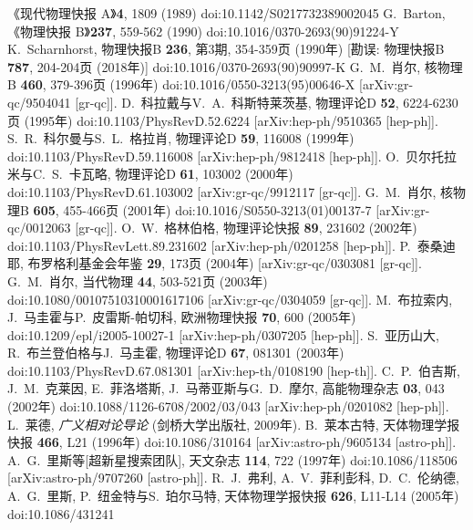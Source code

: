 \documentclass[jkps,preprint,fleqn]{revtex4}
\begin{document}
\begin{CJK*}{UTF8}{gbsn}
\begin{thebibliography}{999}
《现代物理快报 A》\textbf{4}, 1809 (1989)
doi:10.1142/S0217732389002045
G.~Barton,
《物理快报 B》\textbf{237}, 559-562 (1990)
doi:10.1016/0370-2693(90)91224-Y
K.~Scharnhorst,
物理快报B \textbf{236}, 第3期, 354-359页 (1990年)
[勘误: 物理快报B \textbf{787}, 204-204页 (2018年)]
doi:10.1016/0370-2693(90)90997-K
G.~M.~肖尔,
核物理B \textbf{460}, 379-396页 (1996年)
doi:10.1016/0550-3213(95)00646-X
[arXiv:gr-qc/9504041 [gr-qc]].
D.~科拉戴与V.~A.~科斯特莱茨基,
物理评论D \textbf{52}, 6224-6230页 (1995年)
doi:10.1103/PhysRevD.52.6224
[arXiv:hep-ph/9510365 [hep-ph]].
S.~R.~科尔曼与S.~L.~格拉肖,
物理评论D \textbf{59}, 116008 (1999年)
doi:10.1103/PhysRevD.59.116008
[arXiv:hep-ph/9812418 [hep-ph]].
O.~贝尔托拉米与C.~S.~卡瓦略,
物理评论D \textbf{61}, 103002 (2000年)
doi:10.1103/PhysRevD.61.103002
[arXiv:gr-qc/9912117 [gr-qc]].
G.~M.~肖尔,
核物理B \textbf{605}, 455-466页 (2001年)
doi:10.1016/S0550-3213(01)00137-7
[arXiv:gr-qc/0012063 [gr-qc]].
O.~W.~格林伯格,
物理评论快报 \textbf{89}, 231602 (2002年)
doi:10.1103/PhysRevLett.89.231602
[arXiv:hep-ph/0201258 [hep-ph]].
P.~泰桑迪耶,
布罗格利基金会年鉴 \textbf{29}, 173页 (2004年)
[arXiv:gr-qc/0303081 [gr-qc]].
G.~M.~肖尔,
当代物理 \textbf{44}, 503-521页 (2003年)
doi:10.1080/00107510310001617106
[arXiv:gr-qc/0304059 [gr-qc]].
M.~布拉索内, J.~马圭霍与P.~皮雷斯-帕切科,
欧洲物理快报 \textbf{70}, 600 (2005年)
doi:10.1209/epl/i2005-10027-1
[arXiv:hep-ph/0307205 [hep-ph]].
S.~亚历山大, R.~布兰登伯格与J.~马圭霍,
物理评论D \textbf{67}, 081301 (2003年)
doi:10.1103/PhysRevD.67.081301
[arXiv:hep-th/0108190 [hep-th]].
C.~P.~伯吉斯, J.~M.~克莱因, E.~菲洛塔斯, J.~马蒂亚斯与G.~D.~摩尔,
高能物理杂志 \textbf{03}, 043 (2002年)
doi:10.1088/1126-6708/2002/03/043
[arXiv:hep-ph/0201082 [hep-ph]].
 L.~莱德, \textit{广义相对论导论} (剑桥大学出版社, 2009年).
B.~莱本古特,
天体物理学报快报 \textbf{466}, L21 (1996年)
doi:10.1086/310164
[arXiv:astro-ph/9605134 [astro-ph]].
A.~G.~里斯等[超新星搜索团队],
天文杂志 \textbf{114}, 722 (1997年)
doi:10.1086/118506
[arXiv:astro-ph/9707260 [astro-ph]].
R.~J.~弗利, A.~V.~菲利彭科, D.~C.~伦纳德, A.~G.~里斯, P.~纽金特与S.~珀尔马特,
天体物理学报快报 \textbf{626}, L11-L14 (2005年)
doi:10.1086/431241

\end{thebibliography}
\end{CJK*}
\end{document}
